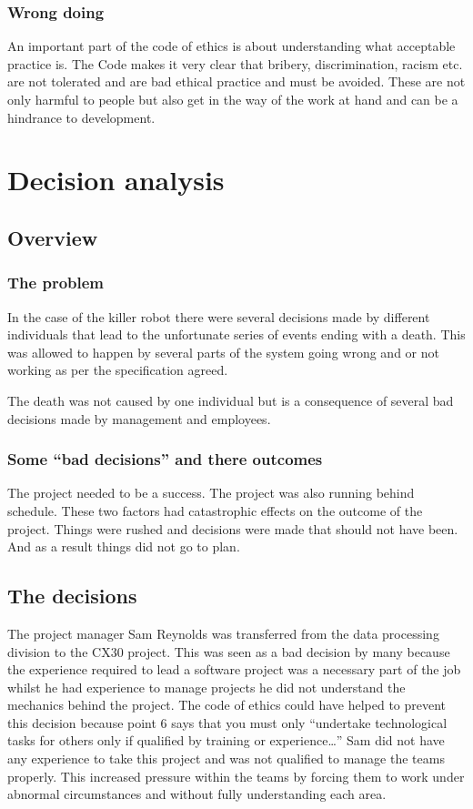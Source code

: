 \documentclass[a4paper]{article}
\begin{document}
\subsubsection{Wrong doing}

An important part of the code of ethics is about understanding what acceptable practice is. The Code makes it very clear that bribery, discrimination, racism etc. are not tolerated and are bad ethical practice and must be avoided. These are not only harmful to people but also get in the way of the work at hand and can be a hindrance to development.

\section{Decision analysis}

\subsection{Overview}
\subsubsection{The problem}

In the case of the killer robot there were several decisions made by different individuals that lead to the unfortunate series of events ending with a death.
This was allowed to happen by several parts of the system going wrong and or not working as per the specification agreed.

The death was not caused by one individual but is a consequence of several bad decisions made by management and employees.
\subsubsection{Some ``bad decisions'' and there outcomes}

The project needed to be a success. The project was also running behind schedule. These two factors had catastrophic effects on the outcome of the project. Things were rushed and decisions were made that should not have been. And as a result things did not go to plan.
\subsection{The decisions}

The project manager Sam Reynolds was transferred from the data processing division to the CX30 project. This was seen as a bad decision by many because the experience required to lead a software project was a necessary part of the job whilst he had experience to manage projects he did not understand the mechanics behind the project. 
The code of ethics could have helped to prevent this decision because point 6 says that you must only “undertake technological tasks for others only if qualified by training or experience…” Sam did not have any experience to take this project and was not qualified to manage the teams properly. This increased pressure within the teams by forcing them to work under abnormal circumstances and without fully understanding each area.
\end{document}
